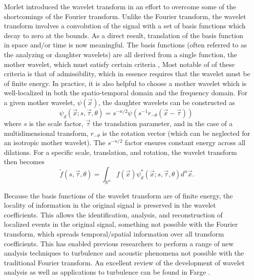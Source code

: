 Morlet \citep{Morlet1981} introduced the wavelet transform in an effort to overcome some of the shortcomings of the Fourier transform.
Unlike the Fourier transform, the wavelet transform involves a convolution of the signal with a set of basis functions which decay to zero at the bounds.
As a direct result, translation of the basis function in space and/or time is now meaningful. 
The basis functions (often referred to as the analyzing or daughter wavelets) are all derived from a single function, the mother wavelet, which must satisfy certain criteria \citep{Farge1992},
Most notable of of these criteria is that of admissibility, which in essence requires that the wavelet must be of finite energy. 
In practice, it is also helpful to choose a mother wavelet which is well-localized in both the spatio-temporal domain and the frequency domain. 
For a given mother wavelet, $\psi (\vec{x})$, the daughter wavelets can be constructed as
\begin{equation}
	\psi_d \left( \vec{x};s,\vec{\tau},\theta \right) = s^{-n/2} \psi \left( s^{-1} r_{-\theta} \left(\vec{x}-\vec{\tau} \right) \right) \
	\label{eq:daughter_wavelets}
\end{equation}
where $s$ is the scale factor, $\vec{\tau}$ the translation parameter, and in the case of a multidimensional transform, $r_{-\theta}$ is the rotation vector (which can be neglected for an isotropic mother wavelet). 
The $s^{-n/2}$ factor ensures constant energy across all dilations. 
For a specific scale, translation, and rotation, the wavelet transform then becomes
\begin{equation}
	\tilde{f} \left( s, \vec{\tau}, \theta \right) = \int_{\mathbb{R}^n} f \left( \vec{x} \right) \psi^*_d \left( \vec{x};s,\vec{\tau},\theta \right) d^n \vec{x}.
\end{equation}

Because the basis functions of the wavelet transform are of finite energy, the locality of information in the original signal is preserved in the wavelet coefficients. 
This allows the identification, analysis, and reconstruction of localized events in the original signal, something not possible with the Fourier transform, which spreads temporal/spatial information over all transform coefficients. 
This has enabled previous researchers to perform a range of new analysis techniques to turbulence and acoustic phenomena not possible with the traditional Fourier transform. An excellent review of the development of wavelet analysis as well as applications to turbulence can be found in Farge \citep{Farge1992}.

